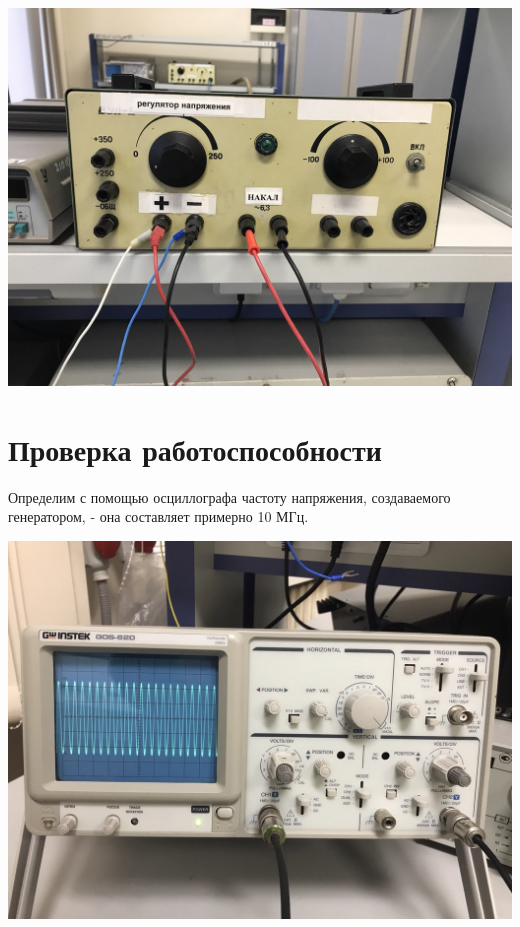 \documentclass[a4paper,12pt]{article} %
\begin{document}
\medskip
\begin{center}

  \centering
  \includegraphics[scale={0.2}]{блок.jpg}

\end{center}

\section{Проверка работоспособности}

\noindent Определим с помощью осциллографа частоту напряжения, создаваемого генератором, - она составляет примерно 10 МГц.

\medskip
\begin{center}

  \centering
  \includegraphics[scale={0.2}]{осц.jpg}


\end{center}
\end{document}
